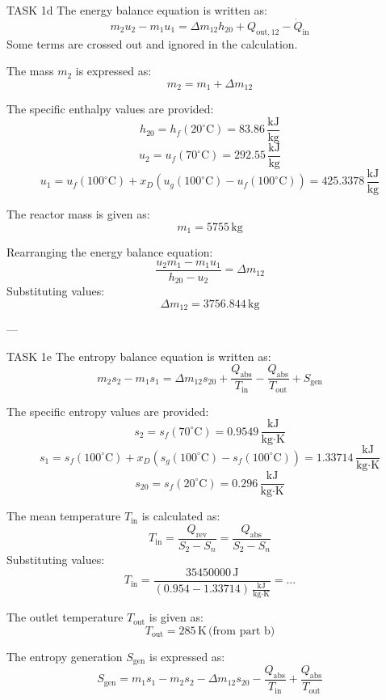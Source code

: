 TASK 1d  
The energy balance equation is written as:  
\[
m_2 u_2 - m_1 u_1 = \Delta m_{12} h_{20} + Q_{\text{out},12} - \dot{Q}_{\text{in}}
\]  
Some terms are crossed out and ignored in the calculation.

The mass \( m_2 \) is expressed as:  
\[
m_2 = m_1 + \Delta m_{12}
\]  

The specific enthalpy values are provided:  
\[
h_{20} = h_f(20^\circ\text{C}) = 83.86 \, \frac{\text{kJ}}{\text{kg}}
\]  
\[
u_2 = u_f(70^\circ\text{C}) = 292.55 \, \frac{\text{kJ}}{\text{kg}}
\]  
\[
u_1 = u_f(100^\circ\text{C}) + x_D \left( u_g(100^\circ\text{C}) - u_f(100^\circ\text{C}) \right) = 425.3378 \, \frac{\text{kJ}}{\text{kg}}
\]  

The reactor mass is given as:  
\[
m_1 = 5755 \, \text{kg}
\]  

Rearranging the energy balance equation:  
\[
\frac{u_2 m_1 - m_1 u_1}{h_{20} - u_2} = \Delta m_{12}
\]  
Substituting values:  
\[
\Delta m_{12} = 3756.844 \, \text{kg}
\]  

---

TASK 1e  
The entropy balance equation is written as:  
\[
m_2 s_2 - m_1 s_1 = \Delta m_{12} s_{20} + \frac{Q_{\text{abs}}}{T_{\text{in}}} - \frac{Q_{\text{abs}}}{T_{\text{out}}} + S_{\text{gen}}
\]  

The specific entropy values are provided:  
\[
s_2 = s_f(70^\circ\text{C}) = 0.9549 \, \frac{\text{kJ}}{\text{kg·K}}
\]  
\[
s_1 = s_f(100^\circ\text{C}) + x_D \left( s_g(100^\circ\text{C}) - s_f(100^\circ\text{C}) \right) = 1.33714 \, \frac{\text{kJ}}{\text{kg·K}}
\]  
\[
s_{20} = s_f(20^\circ\text{C}) = 0.296 \, \frac{\text{kJ}}{\text{kg·K}}
\]  

The mean temperature \( T_{\text{in}} \) is calculated as:  
\[
T_{\text{in}} = \frac{Q_{\text{rev}}}{S_2 - S_n} = \frac{Q_{\text{abs}}}{S_2 - S_n}
\]  
Substituting values:  
\[
T_{\text{in}} = \frac{35450000 \, \text{J}}{(0.954 - 1.33714) \, \frac{\text{kJ}}{\text{kg·K}}} = \dots
\]  

The outlet temperature \( T_{\text{out}} \) is given as:  
\[
T_{\text{out}} = 285 \, \text{K} \, \text{(from part b)}
\]  

The entropy generation \( S_{\text{gen}} \) is expressed as:  
\[
S_{\text{gen}} = m_1 s_1 - m_2 s_2 - \Delta m_{12} s_{20} - \frac{Q_{\text{abs}}}{T_{\text{in}}} + \frac{Q_{\text{abs}}}{T_{\text{out}}}
\]  

